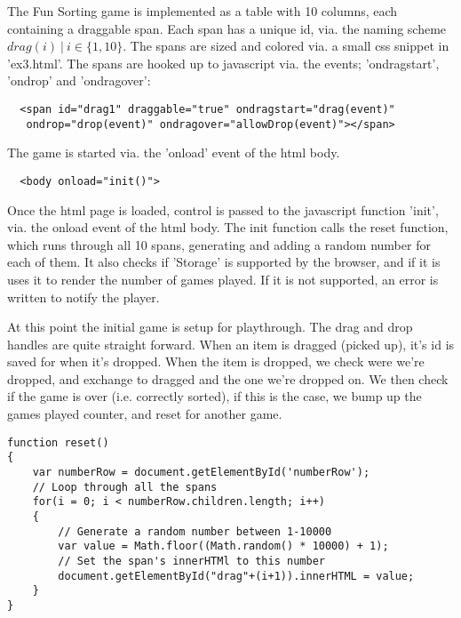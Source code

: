 The Fun Sorting game is implemented as a table with 10 columns, each containing a draggable span.
Each span has a unique id, via. the naming scheme $drag(i) \:|\: i \in \{1,10\}$.
The spans are sized and colored via. a small css snippet in 'ex3.html'.
\newline
The spans are hooked up to javascript via. the events; 'ondragstart', 'ondrop' and 'ondragover':
\begin{verbatim}
  <span id="drag1" draggable="true" ondragstart="drag(event)"
   ondrop="drop(event)" ondragover="allowDrop(event)"></span>
\end{verbatim}
The game is started via. the 'onload' event of the html body. 
\begin{verbatim}
  <body onload="init()">
\end{verbatim}
Once the html page is loaded, control is passed to the javascript function 'init', via. the onload event of the html body.
The init function calls the reset function, which runs through all 10 spans, generating and adding a random number for each of them.
\newline
It also checks if 'Storage' is supported by the browser, and if it is uses it to render the number of games played.
If it is not supported, an error is written to notify the player.

At this point the initial game is setup for playthrough.
\newline\newline
The drag and drop handles are quite straight forward. When an item is dragged (picked up), it's id is saved for when it's dropped.
When the item is dropped, we check were we're dropped, and exchange to dragged and the one we're dropped on.
We then check if the game is over (i.e. correctly sorted), if this is the case, we bump up the games played counter, and reset for another game.

\begin{verbatim}
function reset()
{
    var numberRow = document.getElementById('numberRow');
    // Loop through all the spans
    for(i = 0; i < numberRow.children.length; i++)
    {
        // Generate a random number between 1-10000
        var value = Math.floor((Math.random() * 10000) + 1);
        // Set the span's innerHTMl to this number
        document.getElementById("drag"+(i+1)).innerHTML = value;
    }
}
\end{verbatim}
